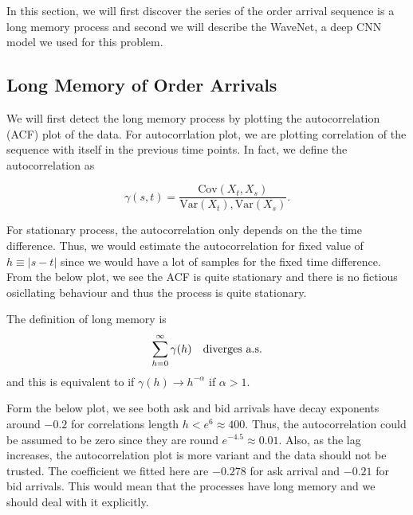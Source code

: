 \documentclass[letterpaper,12pt]{article}
\numberwithin{equation}{section}
\begin{document}
In this section, we will first discover the series of the order arrival sequence is a long memory process and second we will describe the WaveNet, a deep CNN model we used for this problem. 

\subsection{Long Memory of Order Arrivals}

We will first detect the long memory process by plotting the autocorrelation (ACF) plot of the data. 
For autocorrlation plot, we are plotting correlation of the sequence with itself in the previous time points. In fact, we define the autocorrelation as 

\begin{equation}
\gamma(s,t) = \frac{\text{Cov}(X_t, X_s)}{\text{Var}(X_t),\text{Var}(X_s) } .
\end{equation}

For stationary process, the autocorrelation only depends on the the time difference. Thus, we would estimate the autocorrelation for fixed value of $h \equiv |s - t|$ since we would have a lot of samples for the fixed time difference. From the below plot, we see the ACF is quite stationary and there is no fictious osicllating behaviour and thus the process is quite stationary. 

The definition of long memory is $$\sum_{h=0}^\infty \gamma(h)  \text{\quad  diverges a.s.}$$
and this is equivalent to if $\gamma(h) \rightarrow h^{- \alpha} $ if $\alpha > 1$. 

Form the below plot, we see both ask and bid arrivals have decay exponents around $-0.2$ for correlations length $h< e^6 \approx 400$. Thus, the autocorrelation could be assumed to be zero since they are round $e^{-4.5} \approx 0.01$. Also, as the lag increases, the autocorrelation plot is more variant and the data should not be trusted. The coefficient we fitted here are $-0.278$ for ask arrival and $-0.21$ for bid arrivals. This would mean that the processes have long memory and we should deal with it explicitly.
\end{document}
